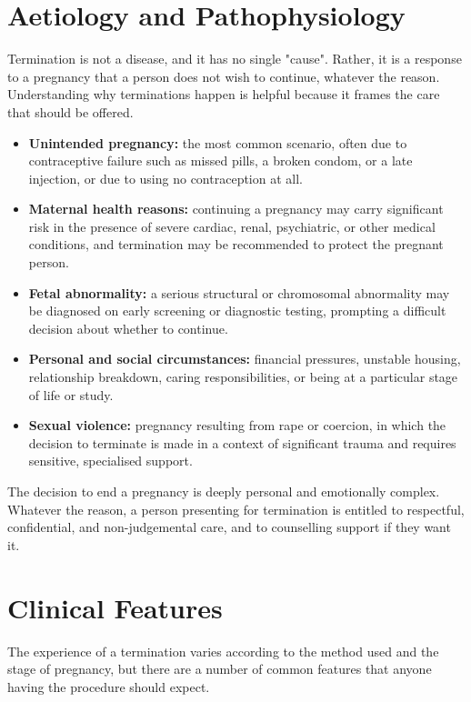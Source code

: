 \section*{Aetiology and Pathophysiology}
Termination is not a disease, and it has no single "cause". Rather, it is a response to a pregnancy that a person does not wish to continue, whatever the reason. Understanding why terminations happen is helpful because it frames the care that should be offered.

\begin{itemize}
    \item \textbf{Unintended pregnancy:} the most common scenario, often due to contraceptive failure such as missed pills, a broken condom, or a late injection, or due to using no contraception at all.
    \item \textbf{Maternal health reasons:} continuing a pregnancy may carry significant risk in the presence of severe cardiac, renal, psychiatric, or other medical conditions, and termination may be recommended to protect the pregnant person.
    \item \textbf{Fetal abnormality:} a serious structural or chromosomal abnormality may be diagnosed on early screening or diagnostic testing, prompting a difficult decision about whether to continue.
    \item \textbf{Personal and social circumstances:} financial pressures, unstable housing, relationship breakdown, caring responsibilities, or being at a particular stage of life or study.
    \item \textbf{Sexual violence:} pregnancy resulting from rape or coercion, in which the decision to terminate is made in a context of significant trauma and requires sensitive, specialised support.
\end{itemize}

The decision to end a pregnancy is deeply personal and emotionally complex. Whatever the reason, a person presenting for termination is entitled to respectful, confidential, and non-judgemental care, and to counselling support if they want it.

\section*{Clinical Features}
The experience of a termination varies according to the method used and the stage of pregnancy, but there are a number of common features that anyone having the procedure should expect.

